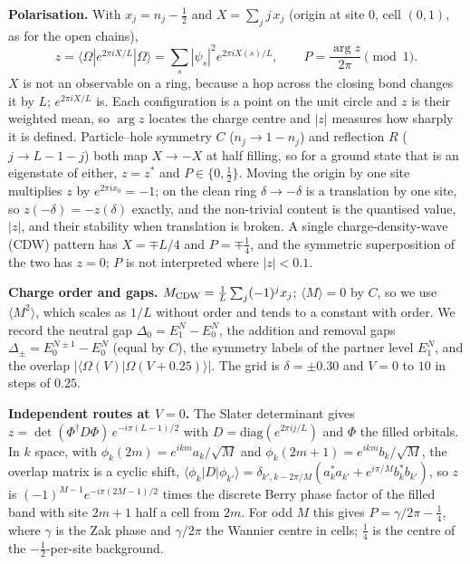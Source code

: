 \documentclass[11pt,a4paper]{article}
\newcommand{\dg}{^{\dagger}}
\begin{document}
\textbf{Polarisation.} With $x_j=n_j-\tfrac12$ and $X=\sum_jj\,x_j$ (origin at site 0, cell $(0,1)$, as for the open chains),
\begin{equation}
  z=\langle\Omega|e^{2\pi iX/L}|\Omega\rangle=\sum_s|\psi_s|^2e^{2\pi iX(s)/L},\qquad P=\frac{\arg z}{2\pi}\pmod1 .
  \label{eq:resta}
\end{equation}
$X$ is not an observable on a ring, because a hop across the closing bond changes it by $L$; $e^{2\pi iX/L}$ is.
Each configuration is a point on the unit circle and $z$ is their weighted mean, so $\arg z$ locates the charge centre and $|z|$ measures how sharply it is defined.
Particle--hole symmetry $C$ ($n_j\to1-n_j$) and reflection $R$ ($j\to L-1-j$) both map $X\to-X$ at half filling, so for a ground state that is an eigenstate of either, $z=z^*$ and $P\in\{0,\tfrac12\}$.
Moving the origin by one site multiplies $z$ by $e^{2\pi ix_0}=-1$; on the clean ring $\delta\to-\delta$ is a translation by one site, so $z(-\delta)=-z(\delta)$ exactly, and the non-trivial content is the quantised value, $|z|$, and their stability when translation is broken.
A single charge-density-wave (CDW) pattern has $X=\mp L/4$ and $P=\mp\tfrac14$, and the symmetric superposition of the two has $z=0$; $P$ is not interpreted where $|z|<0.1$.

\textbf{Charge order and gaps.}
$M_{\rm CDW}=\frac1L\sum_j(-1)^jx_j$; $\langle M\rangle=0$ by $C$, so we use $\langle M^2\rangle$, which scales as $1/L$ without order and tends to a constant with order.
We record the neutral gap $\Delta_0=E_1^N-E_0^N$, the addition and removal gaps $\Delta_\pm=E_0^{N\pm1}-E_0^N$ (equal by $C$), the symmetry labels of the partner level $E_1^N$, and the overlap $|\langle\Omega(V)|\Omega(V+0.25)\rangle|$.
The grid is $\delta=\pm0.30$ and $V=0$ to $10$ in steps of $0.25$.

\textbf{Independent routes at $V=0$.}
The Slater determinant gives $z=\det(\Phi\dg D\Phi)\,e^{-i\pi(L-1)/2}$ with $D=\mathrm{diag}(e^{2\pi ij/L})$ and $\Phi$ the filled orbitals.
In $k$ space, with $\phi_k(2m)=e^{ikm}a_k/\sqrt M$ and $\phi_k(2m+1)=e^{ikm}b_k/\sqrt M$, the overlap matrix is a cyclic shift, $\langle\phi_k|D|\phi_{k'}\rangle=\delta_{k',k-2\pi/M}(a_k^*a_{k'}+e^{i\pi/M}b_k^*b_{k'})$, so $z$ is $(-1)^{M-1}e^{-i\pi(2M-1)/2}$ times the discrete Berry phase factor of the filled band with site $2m+1$ half a cell from $2m$.
For odd $M$ this gives $P=\gamma/2\pi-\tfrac14$, where $\gamma$ is the Zak phase and $\gamma/2\pi$ the Wannier centre in cells; $\tfrac14$ is the centre of the $-\tfrac12$-per-site background.
\end{document}
